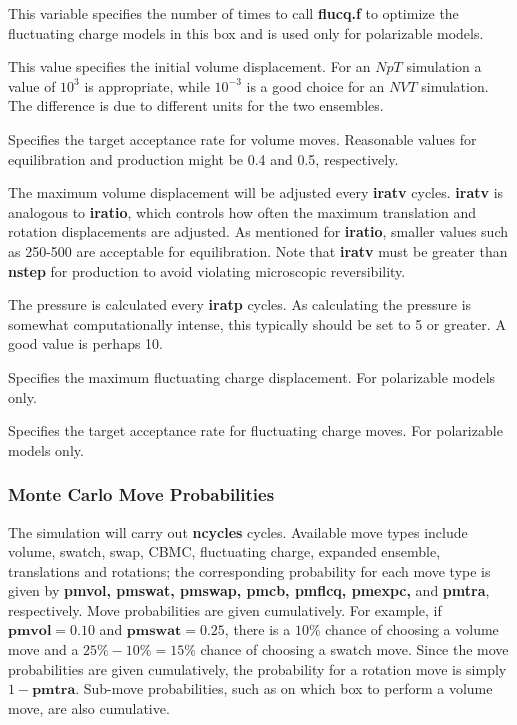 \documentclass[12pt,letterpaper]{article}
\begin{document}
 This variable specifies the number of times to call {\textbf
{flucq.f}} to optimize the fluctuating charge models in this box and is used only for
polarizable models.

 This value specifies the initial volume displacement. 
For an $NpT$ simulation a value of $10^3$ is appropriate, while $10^{-3}$ is a good choice
for an $NVT$ simulation.
The difference is due to different units for the two ensembles.

 Specifies the target acceptance rate for volume
moves.  Reasonable values for equilibration and production might be 0.4 and 0.5, 
respectively.

 The maximum volume displacement will be adjusted every 
{\textbf{iratv}} cycles.  {\textbf{iratv}} is analogous to {\textbf {iratio}}, which controls how often
the maximum translation and rotation displacements are adjusted.
As mentioned for {\textbf{iratio}}, smaller values such as 250-500 are acceptable for
equilibration. 
Note that {\textbf{iratv}} must be greater than {\textbf{nstep}} for production to avoid
violating microscopic reversibility.

 The pressure is calculated every {\textbf{iratp}} cycles.
As calculating the pressure is somewhat computationally
intense, this typically should be set to 5 or greater.  A good value is perhaps 10.

 Specifies the maximum fluctuating charge displacement.  
For polarizable models only.

 Specifies the target acceptance rate for fluctuating charge moves.  
For polarizable models only.

\subsubsection{Monte Carlo Move Probabilities}
The simulation will carry out {\textbf {ncycles}} cycles.  Available move types include
volume, swatch, swap, CBMC, fluctuating charge, expanded ensemble, translations and rotations;
the corresponding probability for each move type is given by 
{\textbf{pmvol, pmswat, pmswap, pmcb, pmflcq, pmexpc,}} and {\textbf {pmtra}}, respectively.
Move probabilities are given cumulatively.  For example, if ${\textbf{pmvol}} = 0.10$ and
${\textbf{pmswat}} = 0.25$, there is a $10\%$ chance of choosing a volume move and a $25\%-10\% = 15\%$ 
chance of choosing a swatch move.
Since the move probabilities are given cumulatively, the probability for a rotation move is simply $1 - {\textbf{pmtra}}$.
Sub-move probabilities, such as on which box to perform a volume move, are also cumulative.
\end{document}
